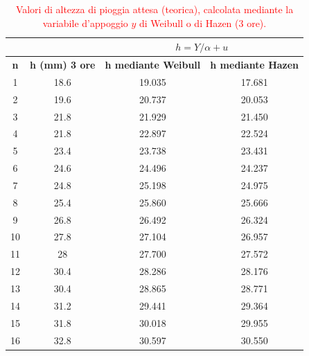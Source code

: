 \begin{table}[H] \centering
    \caption{\textcolor{red}{Valori di altezza di pioggia attesa (teorica), calcolata mediante la variabile d'appoggio $y$ di Weibull o di Hazen (3 ore).}}
    \begin{tabular}{cccc}
 & & \multicolumn{2}{c}{$h = Y/\alpha + u$}       \\
 \toprule
    \textbf{n} & \textbf{h (mm)  3 ore} & \textbf{h mediante Weibull} & \textbf{h mediante Hazen} \\
\midrule
    1          & 18.6                      & 19.035                & 17.681                 \\
    2          & 19.6                      & 20.737                & 20.053                 \\
    3          & 21.8                      & 21.929                & 21.450                 \\
    4          & 21.8                      & 22.897                & 22.524                 \\
    5          & 23.4                      & 23.738                & 23.431                 \\
    6          & 24.6                      & 24.496                & 24.237                 \\
    7          & 24.8                      & 25.198                & 24.975                 \\
    8          & 25.4                      & 25.860                & 25.666                 \\
    9          & 26.8                      & 26.492                & 26.324                 \\
    10         & 27.8                      & 27.104                & 26.957                 \\
    11         & 28                        & 27.700                & 27.572                 \\
    12         & 30.4                      & 28.286                & 28.176                 \\
    13         & 30.4                      & 28.865                & 28.771                 \\
    14         & 31.2                      & 29.441                & 29.364                 \\
    15         & 31.8                      & 30.018                & 29.955                 \\
    16         & 32.8                      & 30.597                & 30.550                 \\

\end{tabular}
\end{table}
